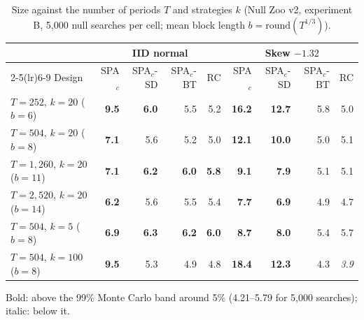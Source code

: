 \begin{table}[t]
\centering
\footnotesize
\setlength{\tabcolsep}{3.5pt}
\caption{Size against the number of periods $T$ and strategies $k$ (Null Zoo v2, experiment B, 5{,}000 null searches per cell; mean block length $b=\mathrm{round}(T^{1/3})$).}
\label{tab:grid}
\begin{tabular}{lrrrrrrrr}
\toprule
 & \multicolumn{4}{c}{IID normal} & \multicolumn{4}{c}{Skew $-1.32$} \\
\cmidrule(lr){2-5}\cmidrule(lr){6-9}
Design & SPA$_c$ & SPA$_c$-SD & SPA$_c$-BT & RC & SPA$_c$ & SPA$_c$-SD & SPA$_c$-BT & RC \\
\midrule
$T=252$, $k=20$ ($b=6$) & \textbf{9.5} & \textbf{6.0} & 5.5 & 5.2 & \textbf{16.2} & \textbf{12.7} & 5.8 & 5.0 \\
$T=504$, $k=20$ ($b=8$) & \textbf{7.1} & 5.6 & 5.2 & 5.0 & \textbf{12.1} & \textbf{10.0} & 5.0 & 5.1 \\
$T=1{,}260$, $k=20$ ($b=11$) & \textbf{7.1} & \textbf{6.2} & \textbf{6.0} & \textbf{5.8} & \textbf{9.1} & \textbf{7.9} & 5.1 & 5.1 \\
$T=2{,}520$, $k=20$ ($b=14$) & \textbf{6.2} & 5.6 & 5.5 & 5.4 & \textbf{7.7} & \textbf{6.9} & 4.9 & 4.7 \\
$T=504$, $k=5$ ($b=8$) & \textbf{6.9} & \textbf{6.3} & \textbf{6.2} & \textbf{6.0} & \textbf{8.7} & \textbf{8.0} & 5.4 & 5.7 \\
$T=504$, $k=100$ ($b=8$) & \textbf{9.5} & 5.3 & 4.9 & 4.8 & \textbf{18.4} & \textbf{12.3} & 4.3 & \textit{3.9} \\
\bottomrule
\end{tabular}
\par\smallskip\begin{minipage}{0.97\linewidth}\footnotesize Bold: above the 99\% Monte Carlo band around 5\% (4.21--5.79 for 5{,}000 searches); italic: below it.\end{minipage}
\end{table}

